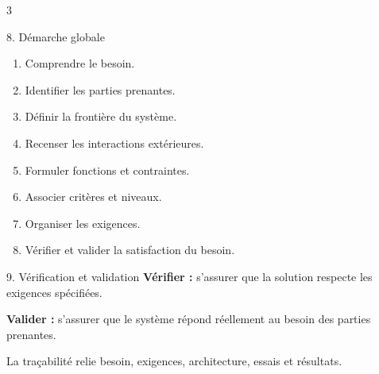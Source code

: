 \documentclass[a3paper,landscape,10pt]{article}
\begin{document}
\begin{multicols}{3}
\begin{TLPosterBloc}{8. Démarche globale}
\begin{enumerate}
  \item Comprendre le besoin.
  \item Identifier les parties prenantes.
  \item Définir la frontière du système.
  \item Recenser les interactions extérieures.
  \item Formuler fonctions et contraintes.
  \item Associer critères et niveaux.
  \item Organiser les exigences.
  \item Vérifier et valider la satisfaction du besoin.
\end{enumerate}
\end{TLPosterBloc}

\begin{TLPosterBloc}{9. Vérification et validation}
\textbf{Vérifier :} s'assurer que la solution respecte les exigences spécifiées.

\textbf{Valider :} s'assurer que le système répond réellement au besoin des parties prenantes.

La traçabilité relie besoin, exigences, architecture, essais et résultats.
\end{TLPosterBloc}

\end{multicols}
\end{document}
